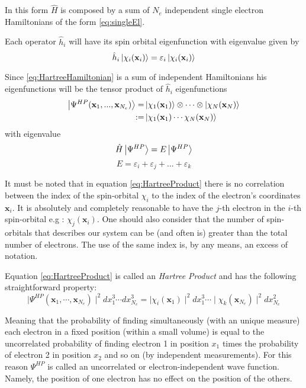 \documentclass[a4paper,12pt]{article}
\begin{document}
In this form $\hat{H}$ is composed by a sum of $N_e$ independent single electron Hamiltonians of the form \eqref{eq:singleEl}.

Each operator $\hat{h}_i$ will have its spin orbital eigenfunction with eigenvalue given by
\begin{equation}
	\hat{h}_{i} \ket{\chi_{i}(\mathbf{x}_i) } = \varepsilon_{i} \ket{\chi_{i}(\mathbf{x}_i) }
\end{equation}

Since \eqref{eq:HartreeHamiltonian} is a sum of independent Hamiltonians his eigenfunctions will be the tensor product of $\hat{h}_i$ eigenfunctions
\begin{align}\label{eq:HartreeProduct}
	\ket{\Psi^{HP}(\mathbf{x}_{1},...,\mathbf{x}_{N_e})} = & \ket{\chi_1(\mathbf{x}_{1})} \otimes \cdots  \otimes \ket{\chi_N(\mathbf{x}_{N})} \\
	:= & \ket{ \chi_{1}(\mathbf{x}_{1}) \cdots \chi_{N}(\mathbf{x}_{N}) }
\end{align}
with eigenvalue
\begin{equation}
	\hat{H}\ket{\Psi^{HP}} = E\ket{\Psi^{HP}}
\end{equation}
\begin{equation}
	E = \varepsilon_i + \varepsilon_j + ... + \varepsilon_k
\end{equation}

It must be noted that in equation \eqref{eq:HartreeProduct} there is no correlation between the index of the spin-orbital $\chi_{i}$ to the index of the electron's coordinates $\mathbf{x}_i$. It is absolutely and completely reasonable to have the $j$-th electron in the $i$-th spin-orbital e.g : $\chi_{j}(\mathbf{x}_{i})$.
One should also consider that the number of spin-orbitals that describes our system can be (and often is) greater than the total number of electrons. The use of the same index is, by any means, an excess of notation.


Equation \eqref{eq:HartreeProduct} is called an \textit{Hartree Product} and has the following straightforward property: 
\begin{equation}\label{eq:uncorrelated}
	\mid\Psi^{HP}(\mathbf{x}_1,\cdots,\mathbf{x}_{N_e}) \mid^2 dx_1^3 \cdots dx_{N_e}^3 = \mid\chi_i(\mathbf{x}_1)\mid^2 dx_1^3 \cdots \mid \chi_k(\mathbf{x}_{N_e})\mid^2 dx_{N_e}^2
\end{equation}

Meaning that the probability of finding simultaneously (with an unique measure) each electron in a fixed position (within a small volume) is equal to the uncorrelated probability of finding electron 1 in position $x_1$ times the probability of electron 2 in position $x_2$ and so on (by independent measurements).
For this reason $\Psi^{HP}$ is called an uncorrelated or electron-independent wave function. 
Namely, the position of one electron has no effect on the position of the others. 
\end{document}
